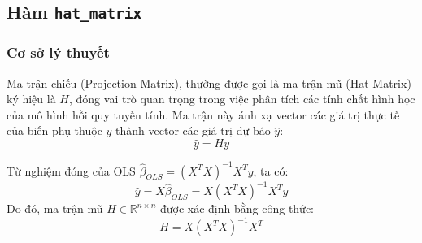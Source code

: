 \subsection{Hàm \texttt{hat\_matrix}}

\subsubsection{Cơ sở lý thuyết}
Ma trận chiếu (Projection Matrix), thường được gọi là ma trận mũ (Hat Matrix) ký hiệu là $H$, đóng vai trò quan trọng trong việc phân tích các tính chất hình học của mô hình hồi quy tuyến tính. Ma trận này ánh xạ vector các giá trị thực tế của biến phụ thuộc $y$ thành vector các giá trị dự báo $\hat{y}$:
\begin{equation}
    \hat{y} = H y
\end{equation}

Từ nghiệm đóng của OLS $\hat{\beta}_{OLS} = (X^T X)^{-1} X^T y$, ta có:
\begin{equation}
    \hat{y} = X \hat{\beta}_{OLS} = X (X^T X)^{-1} X^T y
\end{equation}
Do đó, ma trận mũ $H \in \mathbb{R}^{n \times n}$ được xác định bằng công thức:
\begin{equation}
    H = X (X^T X)^{-1} X^T
\end{equation}

